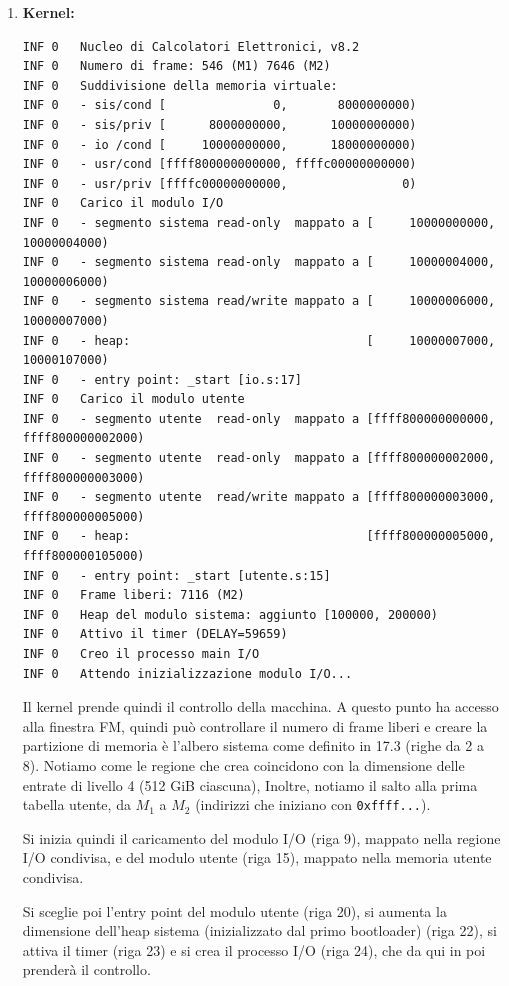 \documentclass[a4paper,11pt]{article}
\begin{document}
\begin{enumerate}
\item \textbf{Kernel:}
\begin{lstlisting}[language={}, style=codestyle]	
INF	0	Nucleo di Calcolatori Elettronici, v8.2
INF	0	Numero di frame: 546 (M1) 7646 (M2)
INF	0	Suddivisione della memoria virtuale:
INF	0	- sis/cond [               0,       8000000000)
INF	0	- sis/priv [      8000000000,      10000000000)
INF	0	- io /cond [     10000000000,      18000000000)
INF	0	- usr/cond [ffff800000000000, ffffc00000000000)
INF	0	- usr/priv [ffffc00000000000,                0)
INF	0	Carico il modulo I/O
INF	0	- segmento sistema read-only  mappato a [     10000000000,      10000004000)
INF	0	- segmento sistema read-only  mappato a [     10000004000,      10000006000)
INF	0	- segmento sistema read/write mappato a [     10000006000,      10000007000)
INF	0	- heap:                                 [     10000007000,      10000107000)
INF	0	- entry point: _start [io.s:17]
INF	0	Carico il modulo utente
INF	0	- segmento utente  read-only  mappato a [ffff800000000000, ffff800000002000)
INF	0	- segmento utente  read-only  mappato a [ffff800000002000, ffff800000003000)
INF	0	- segmento utente  read/write mappato a [ffff800000003000, ffff800000005000)
INF	0	- heap:                                 [ffff800000005000, ffff800000105000)
INF	0	- entry point: _start [utente.s:15]
INF	0	Frame liberi: 7116 (M2)
INF	0	Heap del modulo sistema: aggiunto [100000, 200000)
INF	0	Attivo il timer (DELAY=59659)
INF	0	Creo il processo main I/O
INF	0	Attendo inizializzazione modulo I/O...
\end{lstlisting}

Il kernel prende quindi il controllo della macchina.
A questo punto ha accesso alla finestra FM, quindi può controllare il numero di frame liberi e creare la partizione di memoria è l'albero sistema come definito in 17.3 (righe da 2 a 8).
Notiamo come le regione che crea coincidono con la dimensione delle entrate di livello 4 (512 GiB ciascuna),
Inoltre, notiamo il salto alla prima tabella utente, da $M_1$ a $M_2$ (indirizzi che iniziano con \lstinline|0xffff...|).

Si inizia quindi il caricamento del modulo I/O (riga 9), mappato nella regione I/O condivisa, e del modulo utente (riga 15), mappato nella memoria utente condivisa.

Si sceglie poi l'entry point del modulo utente (riga 20), si aumenta la dimensione dell'heap sistema (inizializzato dal primo bootloader) (riga 22), si attiva il timer (riga 23) e si crea il processo I/O (riga 24), che da qui in poi prenderà il controllo.


\end{enumerate}
\end{document}
